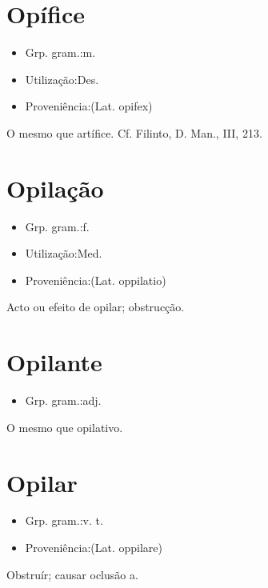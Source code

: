 \section{Opífice}
\begin{itemize}
\item {Grp. gram.:m.}
\end{itemize}
\begin{itemize}
\item {Utilização:Des.}
\end{itemize}
\begin{itemize}
\item {Proveniência:(Lat. \textunderscore opifex\textunderscore )}
\end{itemize}
O mesmo que \textunderscore artífice\textunderscore . Cf. Filinto, \textunderscore D. Man.\textunderscore , III, 213.
\section{Opilação}
\begin{itemize}
\item {Grp. gram.:f.}
\end{itemize}
\begin{itemize}
\item {Utilização:Med.}
\end{itemize}
\begin{itemize}
\item {Proveniência:(Lat. \textunderscore oppilatio\textunderscore )}
\end{itemize}
Acto ou efeito de opilar; obstrucção.
\section{Opilante}
\begin{itemize}
\item {Grp. gram.:adj.}
\end{itemize}
O mesmo que \textunderscore opilativo\textunderscore .
\section{Opilar}
\begin{itemize}
\item {Grp. gram.:v. t.}
\end{itemize}
\begin{itemize}
\item {Proveniência:(Lat. \textunderscore oppilare\textunderscore )}
\end{itemize}
Obstruír; causar oclusão a.
